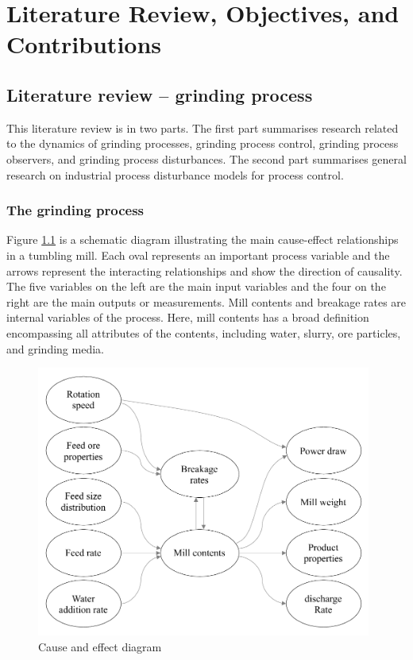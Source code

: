 \chapter{Literature Review, Objectives, and Contributions}
\label{chap-lit-review}

\section{Literature review – grinding process}

This literature review is in two parts. The first part summarises research related to the dynamics of grinding processes, grinding process control, grinding process observers, and grinding process disturbances. The second part summarises general research on industrial process disturbance models for process control.

\subsection{The grinding process}

Figure \ref{fig:cause-effect} is a schematic diagram illustrating the main cause-effect relationships in a tumbling mill. Each oval represents an important process variable and the arrows represent the interacting relationships and show the direction of causality. The five variables on the left are the main input variables and the four on the right are the main outputs or measurements. Mill contents and breakage rates are internal variables of the process. Here, mill contents has a broad definition encompassing all attributes of the contents, including water, slurry, ore particles, and grinding media.
\begin{figure}[htp]
	\centering
	\includegraphics[width=11cm]{images/cause-effect.pdf}
	\caption{Cause and effect diagram} \label{fig:cause-effect}
\end{figure}

